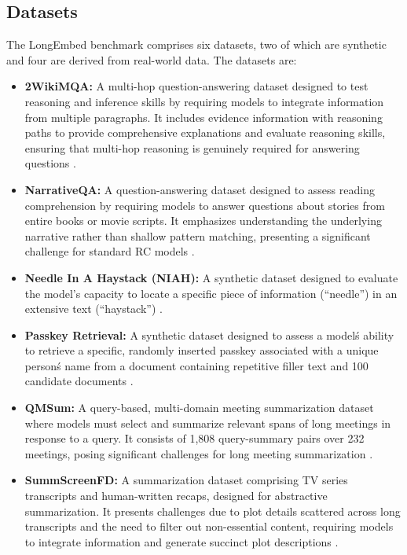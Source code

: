 \subsection{Datasets}
The LongEmbed benchmark comprises six datasets, two of which are synthetic and four are derived from real-world data. The datasets are:
\begin{itemize}
    \item \textbf{2WikiMQA:} A multi-hop question-answering dataset designed to test reasoning and inference skills by requiring models to integrate information from multiple paragraphs. It includes evidence information with reasoning paths to provide comprehensive explanations and evaluate reasoning skills, ensuring that multi-hop reasoning is genuinely required for answering questions \autocite{ho2020constructingmultihopqadataset}.
    \item \textbf{NarrativeQA:} A question-answering dataset designed to assess reading comprehension by requiring models to answer questions about stories from entire books or movie scripts. It emphasizes understanding the underlying narrative rather than shallow pattern matching, presenting a significant challenge for standard RC models \autocite{kočiský2017narrativeqareadingcomprehensionchallenge}.
    \item \textbf{Needle In A Haystack (NIAH):} A synthetic dataset designed to evaluate the model's capacity to locate a specific piece of information (\enquote{needle}) in an extensive text (\enquote{haystack}) \autocite{nelson2024needlehaystackmemorybased}.
    \item \textbf{Passkey Retrieval:} A synthetic dataset designed to assess a model\'s ability to retrieve a specific, randomly inserted passkey associated with a unique person\'s name from a document containing repetitive filler text and 100 candidate documents \autocite{Wang2023ImprovingTE}. 
    \item \textbf{QMSum:} A query-based, multi-domain meeting summarization dataset where models must select and summarize relevant spans of long meetings in response to a query. It consists of 1,808 query-summary pairs over 232 meetings, posing significant challenges for long meeting summarization \autocite{zhong2021qmsumnewbenchmarkquerybased}. 
    \item \textbf{SummScreenFD:} A summarization dataset comprising TV series transcripts and human-written recaps, designed for abstractive summarization. It presents challenges due to plot details scattered across long transcripts and the need to filter out non-essential content, requiring models to integrate information and generate succinct plot descriptions \autocite{chen2022summscreendatasetabstractivescreenplay}. 
\end{itemize}

